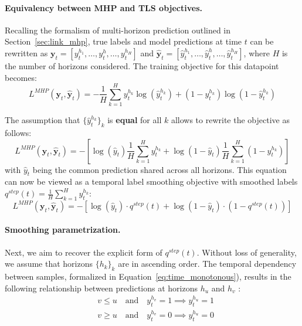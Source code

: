 \documentclass[nohyperref]{article}
\begin{document}
\paragraph{Equivalency between MHP and TLS objectives.}
Recalling the formalism of multi-horizon prediction outlined in Section~\ref{sec:link_mhp}, true labels and model predictions at time $t$ can be rewritten as $\mathbf{y}_{t} = [y^{h_1}_{t}, \ldots, y^{h}_{t}, \ldots, y^{h_H}_{t}]$ and $\hat{\mathbf{y}}_{t} = [\hat{y}^{h_1}_{t}, \ldots, \hat{y}^{h}_{t}, \ldots, \hat{y}^{h_H}_{t}]$, where $H$ is the number of horizons considered. The training objective for this datapoint becomes:
    \begin{equation*}
            L^{MHP}(\mathbf{y}_{t},\hat{\mathbf{y}}_{t}) = -\frac{1}{H}\sum_{k=1}^H y^{h_k}_{t}\log(\hat{y}^{h_k}_{t}) + (1-y^{h_k}_{t})\log(1 - \hat{y}^{h_k}_{t})
    \end{equation*}

The assumption that  $\{\hat{y}^{h_k}_{t}\}_{k}$ is \textbf{equal} for all $k$ allows to rewrite the objective as follows:
    \begin{equation*}
             L^{MHP}(\mathbf{y}_{t},\hat{\mathbf{y}}_{t}) = -\left[\log(\hat{y}_{t})\frac{1}{H}\sum_{k=1}^H y^{h_k}_{t} + \log(1 - \hat{y}_{t})\frac{1}{H}\sum_{k=1}^H (1-y^{h_k}_{t})\right]
    \end{equation*}
with $\hat{y}_{t}$ being the common prediction shared across all horizons. This equation can now be viewed as a temporal label smoothing objective with smoothed labels $q^{step}(t) = \frac{1}{H}\sum_{k=1}^H y^{h_k}_{t}$:
    \begin{equation*}
             L^{MHP}(\mathbf{y}_{t},\hat{\mathbf{y}}_{t}) = -\left[\log(\hat{y}_{t}) \cdot q^{step}(t) + \log(1 - \hat{y}_{t})\cdot \left( 1-q^{step}(t) \right) \right]
    \end{equation*}
    
\paragraph{Smoothing parametrization.}
Next, we aim to recover the explicit form of $q^{step}(t)$. Without loss of generality, we assume that horizons $\{h_k\}_k$ are in ascending order. The temporal dependency between samples, formalized in Equation~\ref{eq:time_monotonous}), results in the following relationship between predictions at horizons $h_u$ and $h_v$ :
\begin{align} \label{eq: mhp_predictions_order_1}
    & v \leq u \quad \text{and} \quad y^{h_v}_{t} = 1 \implies  y^{h_u}_{t} = 1\\
    & v \geq u  \quad \text{and} \quad y^{h_v}_{t} = 0 \implies  y^{h_u}_{t} = 0  \label{eq: mhp_predictions_order_0}
\end{align}
\end{document}
